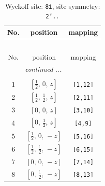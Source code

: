 \documentclass[fleqn,8pt]{jsarticle}
\begin{document}
\renewcommand{\arraystretch}{1.2}
\begin{longtable}{ccc}
\caption{Wyckoff site: {\tt 8i}, site symmetry: {\tt 2'..}}
 \\
 \hline \hline
No. & position & mapping \\ \hline \endfirsthead

\multicolumn{2}{l}{\tablename\ \thetable{}} \\
 \hline \hline
No. & position & mapping \\ \hline \endhead

 \hline \hline
\multicolumn{2}{r}{\footnotesize\it continued ...} \\ \endfoot

 \hline \hline
\multicolumn{2}{r}{} \\ \endlastfoot

1 & $\left[ \frac{1}{2},\, 0,\, z \right]$ & {\tt [1,12]} \\ \hline
2 & $\left[ \frac{1}{2},\, \frac{1}{2},\, z \right]$ & {\tt [2,11]} \\ \hline
3 & $\left[ 0,\, 0,\, z \right]$ & {\tt [3,10]} \\ \hline
4 & $\left[ 0,\, \frac{1}{2},\, z \right]$ & {\tt [4,9]} \\ \hline
5 & $\left[ \frac{1}{2},\, 0,\, - z \right]$ & {\tt [5,16]} \\ \hline
6 & $\left[ \frac{1}{2},\, \frac{1}{2},\, - z \right]$ & {\tt [6,15]} \\ \hline
7 & $\left[ 0,\, 0,\, - z \right]$ & {\tt [7,14]} \\ \hline
8 & $\left[ 0,\, \frac{1}{2},\, - z \right]$ & {\tt [8,13]} \\
\end{longtable}
\renewcommand{\arraystretch}{1.2}
\end{document}
